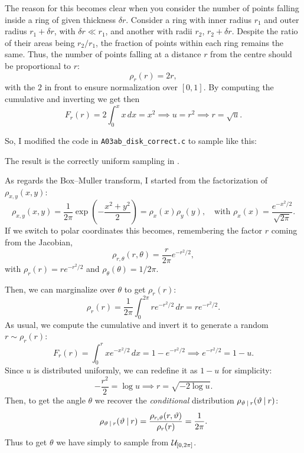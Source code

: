 \documentclass{gulartcl}
\begin{document}
The reason for this becomes clear when you consider the number of points falling
inside a ring of given thickness $\delta r$. Consider a ring with inner radius
$r_1$ and outer radius $r_1 + \delta r$, with $\delta r \ll r_1$, and another
with radii $r_2$, $r_2 + \delta r$.  Despite the ratio of their areas being $r_2
/ r_1$, the fraction of points within each ring remains the same. Thus, the
number of points falling at a distance $r$ from the centre should be
proportional to $r$:
\begin{equation}
    \rho_{r}(r) = 2r,
\end{equation}
with the $2$ in front to ensure normalization over $[0, 1]$. By computing the
cumulative and inverting we get then
\begin{equation}
    F_r(r) = 2 \int_{0}^{x} x \, dx = x^{2} \implies u = r^{2} \implies r =
    \sqrt{u}.
\end{equation}

So, I modified the code in \texttt{A03ab\_disk\_correct.c} to sample like this:

The result is the correctly uniform sampling in .

As regards the Box–Muller transform, I started from the factorization of
$\rho_{x, y}(x, y)$:
\begin{equation}
    \rho_{x, y}(x, y) = \frac{1}{2\pi} \exp\left(-\frac{x^{2} + y^{2}}{2}\right)
        = \rho_x(x) \rho_y(y), \quad \text{with }
        \rho_x(x) = \frac{e^{-x^{2}/2}}{\sqrt{2\pi}}.
\end{equation}
If we switch to polar coordinates this becomes, remembering the factor $r$
coming from the Jacobian,
\begin{equation}
    \rho_{r, \theta}(r, \theta) = \frac{r}{2\pi} e^{-r^{2}/2},
\end{equation}
with $\rho_r(r) = r e^{-r^{2}/2}$ and $\rho_\theta(\theta) = 1 / 2\pi$.

Then, we can marginalize over $\theta$ to get $\rho_r(r)$:
\begin{equation}
    \rho_r(r) = \frac{1}{2\pi} \int_{0}^{2\pi} r e^{-r^{2}/2} \, dr
        = r e^{-r^{2}/2}.
\end{equation}
As usual, we compute the cumulative and invert it to generate a random $r \sim
\rho_r(r)$:
\begin{equation}
    F_r(r) = \int_{0}^{r} x e^{-x^{2}/2} \, dx = 1 - e^{-r^{2}/2}
    \implies e^{-r^{2}/2} = 1 - u.
\end{equation}
Since $u$ is distributed uniformly, we can redefine it as $1 - u$ for
simplicity:
\begin{equation}
    -\frac{r^{2}}{2} = \log u \implies r = \sqrt{-2\log u}.
\end{equation}
Then, to get the angle $\theta$ we recover the \emph{conditional} distribution
$\rho_{\vartheta\:\vert\: r}(\vartheta \:\vert\: r)$:
\begin{equation}
    \rho_{\vartheta\:\vert\: r}(\vartheta\:\vert\: r)
        = \frac{\rho_{r, \vartheta}(r, \vartheta)}{\rho_{r}(r)} = \frac{1}{2\pi}.
\end{equation}
Thus to get $\theta$ we have simply to sample from $\mathcal{U}_{[0, 2\pi]}$.
\end{document}
